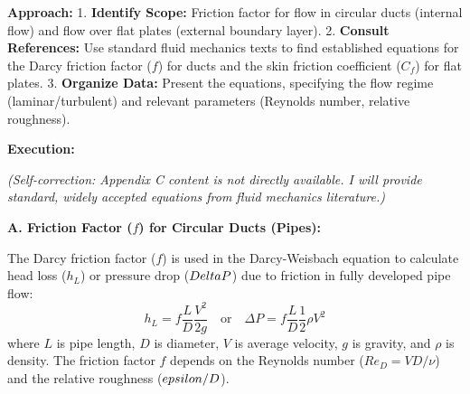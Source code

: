 \textbf{Approach:} 1. \textbf{Identify Scope:} Friction factor for flow
in circular ducts (internal flow) and flow over flat plates (external
boundary layer). 2. \textbf{Consult References:} Use standard fluid
mechanics texts to find established equations for the Darcy friction
factor (\(f\)) for ducts and the skin friction coefficient (\(C_f\)) for
flat plates. 3. \textbf{Organize Data:} Present the equations,
specifying the flow regime (laminar/turbulent) and relevant parameters
(Reynolds number, relative roughness).

\textbf{Execution:}

\emph{(Self-correction: Appendix C content is not directly available. I
will provide standard, widely accepted equations from fluid mechanics
literature.)}

\textbf{A. Friction Factor (\(f\)) for Circular Ducts (Pipes):}

The Darcy friction factor (\(f\)) is used in the Darcy-Weisbach equation
to calculate head loss (\(h_L\)) or pressure drop (\(\\Delta P\)) due to
friction in fully developed pipe flow:
\[ h_L = f \frac{L}{D} \frac{V^2}{2g} \quad \text{or} \quad \Delta P = f \frac{L}{D} \frac{1}{2} \rho V^2 \]
where \(L\) is pipe length, \(D\) is diameter, \(V\) is average
velocity, \(g\) is gravity, and \(\rho\) is density. The friction factor
\(f\) depends on the Reynolds number (\(Re_D = VD/\nu\)) and the
relative roughness (\(\\epsilon/D\)).

